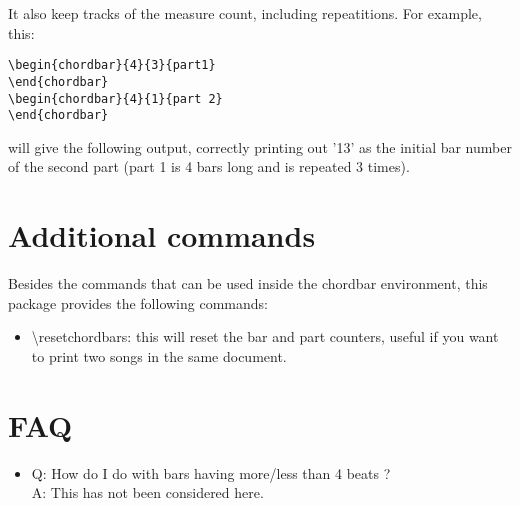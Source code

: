 \documentclass[11pt]{article}
\begin{document}
It also keep tracks of the measure count, including repeatitions. For example, this:

\begin{lstlisting}
\begin{chordbar}{4}{3}{part1}
\end{chordbar}
\begin{chordbar}{4}{1}{part 2}
\end{chordbar}
\end{lstlisting}

will give the following output, correctly printing out '13' as the initial bar number of the second part (part 1 is 4 bars long and is repeated 3 times).

\resetchordbars
\begin{chordbar}{4}{3}{}
\end{chordbar}

\begin{chordbar}{4}{1}{}
\end{chordbar}

\section{Additional commands}

Besides the commands that can be used inside the chordbar environment, this package provides the following commands:

\begin{itemize}
\item {\ttfamily \textbackslash resetchordbars}: this will reset the bar and part counters, useful if you want to print two songs in the same document.
\end{itemize}


\section{FAQ}

\begin{itemize}
\item Q: How do I do with bars having more/less than 4 beats ? \\
A: This has not been considered here.
\end{itemize}
\end{document}
